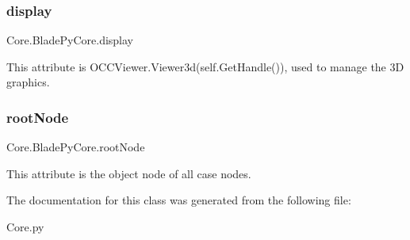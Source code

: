 \subsubsection{\texorpdfstring{display}{display}}
{\footnotesize\ttfamily Core.\+Blade\+Py\+Core.\+display}



This attribute is O\+C\+C\+Viewer.\+Viewer3d(self.\+Get\+Handle()), used to manage the 3D graphics. 

\hypertarget{a00079_a3cbd742c4a4a706d44d5265e19b25aaa}{}\label{a00079_a3cbd742c4a4a706d44d5265e19b25aaa} 
\subsubsection{\texorpdfstring{root\+Node}{rootNode}}
{\footnotesize\ttfamily Core.\+Blade\+Py\+Core.\+root\+Node}



This attribute is the object node of all case nodes. 



The documentation for this class was generated from the following file\+:\begin{DoxyCompactItemize}
\item 
Core.\+py\end{DoxyCompactItemize}
